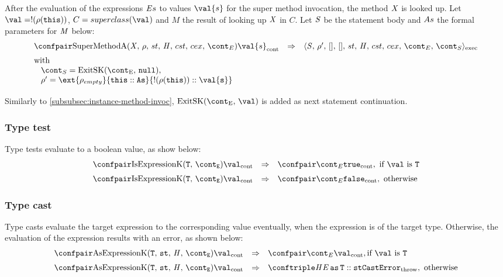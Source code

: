 \documentclass{article}
\begin{document}
After the evaluation of the expressions $\mathit{E}{s}$ to values $\val{s}$ for the super method invocation, the method $\mathit{X}$ is looked up. Let $\val = \deref{(\env(\this))}$, $C = \superclass{\val}$ and $M$ the result of looking up $\mathit{X}$ in $C$. Let $\mathit{S}$ be the statement body and $As$ the formal parameters for $\mathit{M}$ below:
\[
  \begin{array}{lcl}
	\cesktrans{
		\contconf{\SuperMethodA}{\val{s}}}{
		\execconf{\stmt}{\env'}{[]}{[]}{\handler}{\cstrace}{\cex}{\econt}{\scont}}
	\\[2mm]
	\textrm{with }\\
	\hspace{3mm}\scont = \ExitSK{\tt{null}},\\
	\hspace{3mm}\env' = \ext{\env_{empty}}{\this :: \formals}{\deref{(\env(\this))} :: \val{s}}\\[2mm]
  \end{array}
\]
Similarly to \ref{subsubsec:instance-method-invoc}, $\ExitSK{\val}$ is added as next statement continuation.

\subsubsection{Type test}
\label{subsubsec:type-test}
Type tests evaluate to a boolean value, as show below: 
\[
  \begin{array}{lcl}
	\cesktrans{
		\contconf{\IsExpressionK}{\val}}{
		\contconf{\econt}{\true}},
		\textrm{ if }\val \textrm{ is } \tt{T}\\[2mm]

	\cesktrans{
		\contconf{\IsExpressionK}{\val}}{
		\contconf{\econt}{\false}}, \textrm{ otherwise}
  \end{array}
\]

\subsubsection{Type cast}
\label{subsubsec:type-cast}
Type casts evaluate the target expression to the corresponding value eventually, when the expression is of the target type. Otherwise, the evaluation of the expression results with an error, as shown below:
\[
  \begin{array}{lcl}
	\cesktrans{
		\contconf{\AsExpressionK}{\val}}{
		\contconf{\econt}{\val}}, \textrm{if }\val \textrm{ is } \tt{T}\\[2mm]

	\cesktrans{
		\contconf{\AsExpressionK}{\val}}{
		\throwconf{\handler}{\AsExpression{\expressionmeta}{\tt{T}} :: \strace}{\tt{CastError}}}, \textrm{ otherwise}
    \end{array}
\]
\end{document}
